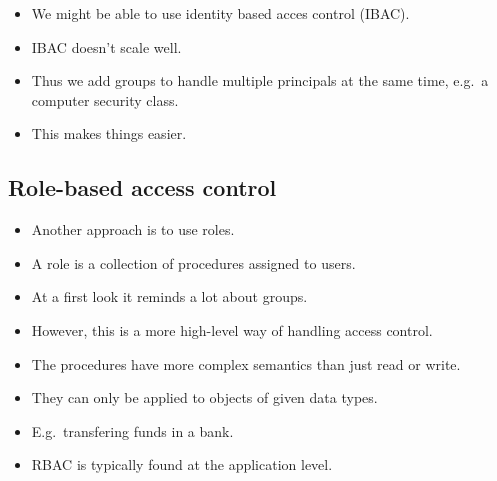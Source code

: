 \begin{frame}
  \begin{itemize}
    \item We might be able to use identity based acces control (IBAC).
    \item IBAC doesn't scale well.

    \item Thus we add groups to handle multiple principals at the same time, 
      e.g.\ a computer security class.

    \item This makes things easier.

  \end{itemize}
\end{frame}

\subsection{Role-based access control}

\begin{frame}
  \begin{itemize}
    \item Another approach is to use roles.

    \item A role is a collection of procedures assigned to users.

    \item At a first look it reminds a lot about groups.

    \item However, this is a more high-level way of handling access control.

  \end{itemize}
\end{frame}

\begin{frame}
  \begin{itemize}
    \item The procedures have more complex semantics than just read or write.

    \item They can only be applied to objects of given data types.

    \item E.g.\ transfering funds in a bank.

    \item RBAC is typically found at the application level.
  \end{itemize}
\end{frame}

